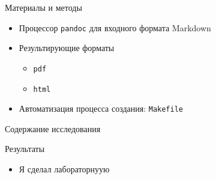 \documentclass[
  ignorenonframetext,
  aspectratio=169,
  russian,
]{beamer}
\providecommand{\tightlist}{%
  \setlength{\itemsep}{0pt}\setlength{\parskip}{0pt}}
\begin{document}
\begin{frame}[fragile]{Материалы и методы}
\label{ux43cux430ux442ux435ux440ux438ux430ux43bux44b-ux438-ux43cux435ux442ux43eux434ux44b}
\begin{itemize}[<+->]
\tightlist
\item
  Процессор \texttt{pandoc} для входного формата Markdown
\item
  Результирующие форматы

  \begin{itemize}[<+->]
  \tightlist
  \item
    \texttt{pdf}
  \item
    \texttt{html}
  \end{itemize}
\item
  Автоматизация процесса создания: \texttt{Makefile}
\end{itemize}
\end{frame}

\begin{frame}{Содержание исследования}
\label{ux441ux43eux434ux435ux440ux436ux430ux43dux438ux435-ux438ux441ux441ux43bux435ux434ux43eux432ux430ux43dux438ux44f}
\end{frame}

\begin{frame}{Результаты}
\label{ux440ux435ux437ux443ux43bux44cux442ux430ux442ux44b}
\begin{itemize}[<+->]
\tightlist
\item
  Я сделал лабораторнуую
\end{itemize}
\end{frame}
\end{document}
